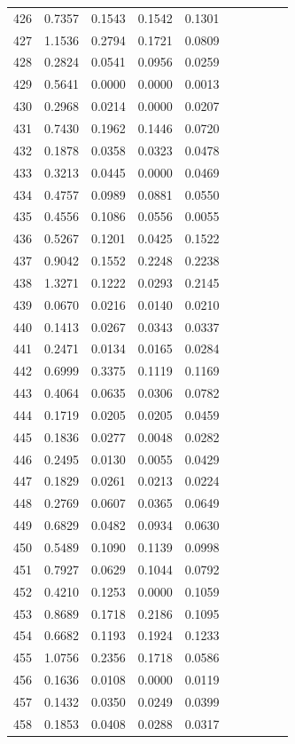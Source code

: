 \begin{table}
\begin{tabular}{cccccccccc}
426& 0.7357& 0.1543& 0.1542& 0.1301\\ 
427& 1.1536& 0.2794& 0.1721& 0.0809\\ 
428& 0.2824& 0.0541& 0.0956& 0.0259\\ 
429& 0.5641& 0.0000& 0.0000& 0.0013\\ 
430& 0.2968& 0.0214& 0.0000& 0.0207\\ 
431& 0.7430& 0.1962& 0.1446& 0.0720\\ 
432& 0.1878& 0.0358& 0.0323& 0.0478\\ 
433& 0.3213& 0.0445& 0.0000& 0.0469\\ 
434& 0.4757& 0.0989& 0.0881& 0.0550\\ 
435& 0.4556& 0.1086& 0.0556& 0.0055\\ 
436& 0.5267& 0.1201& 0.0425& 0.1522\\ 
437& 0.9042& 0.1552& 0.2248& 0.2238\\ 
438& 1.3271& 0.1222& 0.0293& 0.2145\\ 
439& 0.0670& 0.0216& 0.0140& 0.0210\\ 
440& 0.1413& 0.0267& 0.0343& 0.0337\\ 
441& 0.2471& 0.0134& 0.0165& 0.0284\\ 
442& 0.6999& 0.3375& 0.1119& 0.1169\\ 
443& 0.4064& 0.0635& 0.0306& 0.0782\\ 
444& 0.1719& 0.0205& 0.0205& 0.0459\\ 
445& 0.1836& 0.0277& 0.0048& 0.0282\\ 
446& 0.2495& 0.0130& 0.0055& 0.0429\\ 
447& 0.1829& 0.0261& 0.0213& 0.0224\\ 
448& 0.2769& 0.0607& 0.0365& 0.0649\\ 
449& 0.6829& 0.0482& 0.0934& 0.0630\\ 
450& 0.5489& 0.1090& 0.1139& 0.0998\\ 
451& 0.7927& 0.0629& 0.1044& 0.0792\\ 
452& 0.4210& 0.1253& 0.0000& 0.1059\\ 
453& 0.8689& 0.1718& 0.2186& 0.1095\\ 
454& 0.6682& 0.1193& 0.1924& 0.1233\\ 
455& 1.0756& 0.2356& 0.1718& 0.0586\\ 
456& 0.1636& 0.0108& 0.0000& 0.0119\\ 
457& 0.1432& 0.0350& 0.0249& 0.0399\\ 
458& 0.1853& 0.0408& 0.0288& 0.0317\\ 

\end{tabular}
\end{table}
